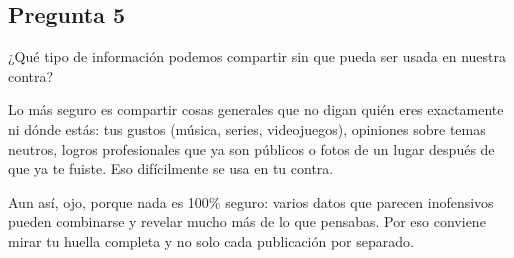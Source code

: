 \subsection{Pregunta 5}

¿Qué tipo de información podemos compartir sin que pueda ser usada en nuestra contra?

\begin{respuesta}
    Lo más seguro es compartir cosas generales que no digan quién eres exactamente ni
    dónde estás: tus gustos (música, series, videojuegos), opiniones sobre temas
    neutros, logros profesionales que ya son públicos o fotos de un lugar después de
    que ya te fuiste. Eso difícilmente se usa en tu contra.

    Aun así, ojo, porque nada es 100\% seguro: varios datos que parecen inofensivos
    pueden combinarse y revelar mucho más de lo que pensabas. Por eso conviene mirar
    tu huella completa y no solo cada publicación por separado.
\end{respuesta}
